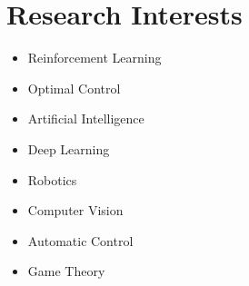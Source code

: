 \documentclass[letterpaper,11pt]{article}
\newcommand{\resumeSubHeadingListStart}{\begin{itemize}[leftmargin=0.0in, label={}]}
\newcommand{\resumeSubHeadingListEnd}{\end{itemize}}
\begin{document}
\section{Research Interests}
        \begin{multicols}{4}
            \begin{itemize}[itemsep=-5pt, parsep=3pt]
                \item \small Reinforcement Learning
                \item Optimal Control
                \item Artificial Intelligence
                \item Deep Learning
                \item Robotics
                \item Computer Vision
                \item Automatic Control
                \item Game Theory
            \end{itemize}
        \end{multicols}
        \vspace*{3.0\multicolsep}

\vspace{1pt}
\end{document}
